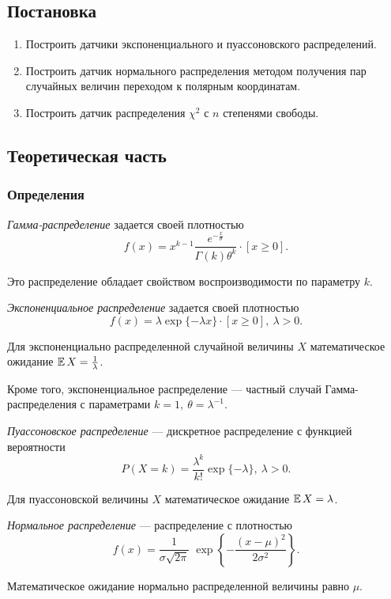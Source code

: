 \documentclass[12pt, a4paper]{article}
\begin{document}
\subsection{Постановка}
\begin{enumerate}
\item Построить датчики экспоненциального и пуассоновского распределений.
\item Построить датчик нормального распределения методом получения пар случайных величин переходом к полярным координатам.
\item Построить датчик распределения $\chi^2$ с $n$ степенями свободы.
\end{enumerate}

\subsection{Теоретическая часть}
\subsubsection{Определения}
\begin{df}
\textit{Гамма-распределение} задается своей плотностью 
\[f(x) = x^{k-1} \frac{e^{-\frac{x}{\theta}}}{\Gamma(k)\theta^k}\cdot \left[ x \geqslant 0 \right].\]
\end{df}
Это распределение обладает свойством воспроизводимости по параметру $k$.
\begin{df}
\textit{Экспоненциальное распределение} задается своей плотностью 
\[f(x) = \lambda\exp{ \{-\lambda x\} }\cdot \left[ x \geqslant 0 \right],\ \lambda>0.\]
\end{df}
Для экспоненциально распределенной случайной величины $X$ математическое ожидание $\operatorname{\mathbb{E}} X = \frac 1\lambda$.

Кроме того, экспоненциальное распределение --- частный случай Гамма-распределения с параметрами $k=1,\  \theta = \lambda^{-1}$.
\begin{df}
\textit{Пуассоновское распределение} --- дискретное распределение с функцией вероятности 
\[P(X = k) = \frac{\lambda^k}{k!}\exp{ \{ -\lambda\} },\ \lambda>0.\]
\end{df}
Для пуассоновской величины $X$ математическое ожидание $\operatorname{\mathbb{E}} X = \lambda$.
\begin{df}
\textit{Нормальное распределение} --- распределение с плотностью
\[f(x) = \frac1{\sigma\sqrt{2\pi}}\; \exp\left\{ -\frac{\left(x-\mu\right)^2}{2\sigma^2} \right\}. \]
\end{df}
Математическое ожидание нормально распределенной величины равно $\mu$.
\end{document}
